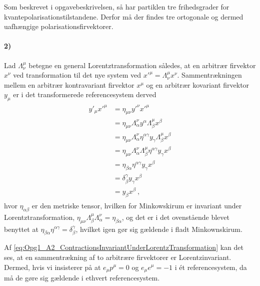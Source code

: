 \documentclass[../main.tex]{subfiles}
\begin{document}
Som beskrevet i opgavebeskrivelsen, så har partiklen tre frihedsgrader for kvantepolarisationstilstandene. Derfor må der findes tre ortogonale og dermed uafhængige polarisationsfirvektorer.



\paragraph[2) $e_\mu p^\mu = 0$ og $e_\mu e^\mu = 1$]{\textbf{2)}}

Lad $\Lambda_\nu^\mu$ betegne en general Lorentztransformation således, at en arbitrær firvektor $x^\nu$ ved transformation til det nye system ved $x'^\mu = \Lambda_\nu^\mu x^\nu$. Sammentrækningen mellem en arbitrær kontravariant firvektor $x^\mu$ og en arbitrær kovariant firvektor $y_\mu$ er i det transformerede referencesystem derved
\begin{align} \label{eq:Opg1_A2_ContractionsInvariantUnderLorentzTransformation}
\begin{split}
    y'_\mu x'^\mu &= \eta_{\mu\nu} y'^\nu x'^\mu \\
        &= \eta_{\mu\nu} \Lambda_\alpha^\nu y^\alpha \Lambda_\beta^\mu x^\beta \\
        &= \eta_{\mu\nu} \Lambda_\alpha^\nu \eta^{\alpha\gamma} y_\gamma \Lambda_\beta^\mu x^\beta \\
        &= \eta_{\mu\nu} \Lambda_\alpha^\nu \Lambda_\beta^\mu \eta^{\alpha\gamma} y_\gamma x^\beta \\
        &= \eta_{\beta\alpha} \eta^{\alpha\gamma} y_\gamma x^\beta \\
        &= \delta_\beta^\gamma y_\gamma x^\beta \\
        &= y_\beta x^\beta \: ,
\end{split}
\end{align}
hvor $\eta_{\alpha\beta}$ er den metriske tensor, hvilken for Minkowskirum er invariant under Lorentztransformation, $\eta_{\mu\nu} \Lambda_\beta^\mu \Lambda_\alpha^\nu = \eta_{\beta\alpha}$, og det er i det ovenstående blevet benyttet at $\eta_{\beta\alpha} \eta^{\alpha\gamma} = \delta_\beta^\gamma$, hvilket igen gør sig gældende i fladt Minkownskirum.

Af \cref{eq:Opg1_A2_ContractionsInvariantUnderLorentzTransformation} kan det ses, at en sammentrækning af to arbitrære firvektorer er Lorentzinvariant. Dermed, hvis vi insisterer på at $e_\mu p^\mu = 0$ og $e_\mu e^\mu = -1$ i ét referencesystem, da må de gøre sig gældende i ethvert referencesystem.
\end{document}

